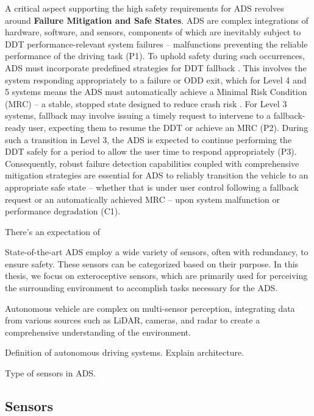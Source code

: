 A critical aspect supporting the high safety requirements for ADS
revolves around \textbf{Failure Mitigation and Safe States}. ADS are
complex integrations of hardware, software, and sensors, components of
which are inevitably subject to DDT performance-relevant system failures
-- malfunctions preventing the reliable performance of the driving task
{ \textsuperscript{} } (P1). To uphold safety during such occurrences,
ADS must incorporate predefined strategies for DDT fallback{
\textsuperscript{} }. This involves the system responding appropriately
to a failure or ODD exit, which for Level 4 and 5 systems means the ADS
must automatically achieve a Minimal Risk Condition (MRC) -- a stable,
stopped state designed to reduce crash risk{ \textsuperscript{} }. For
Level 3 systems, fallback may involve issuing a timely request to
intervene to a fallback-ready user, expecting them to resume the DDT or
achieve an MRC { \textsuperscript{} } (P2). During such a transition in
Level 3, the ADS is expected to continue performing the DDT safely for a
period to allow the user time to respond appropriately {
\textsuperscript{} } (P3). Consequently, robust failure detection
capabilities coupled with comprehensive mitigation strategies are
essential for ADS to reliably transition the vehicle to an appropriate
safe state -- whether that is under user control following a fallback
request or an automatically achieved MRC -- upon system malfunction or
performance degradation { \textsuperscript{} } (C1). { }


There's an expectation of 

State-of-the-art ADS employ a wide variety of sensors, often with redundancy, to ensure safety. These sensors can be categorized based on their purpose. In this thesis, we focus on exteroceptive sensors, which are primarily used for perceiving the surrounding environment to accomplish tasks necessary for the ADS.






Autonomous vehicle are complex on multi-sensor perception, integrating data from various sources such as LiDAR, cameras, and radar to create a comprehensive understanding of the environment.

Definition of autonomous driving systems. Explain architecture.

Type of sensors in ADS.

\subsection{Sensors} \label{Background:Sensors}


